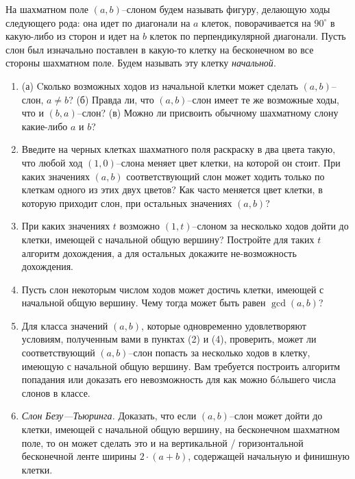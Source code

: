 ﻿

\ms На шахматном поле $(a,b)$--слоном будем называть фигуру, делающую ходы следующего рода: она идет по диагонали на $a$ клеток, поворачивается на $90^{\circ}$ в какую-либо из сторон и идет на $b$ клеток по перпендикулярной диагонали. Пусть слон был изначально поставлен в какую-то клетку на бесконечном во все стороны шахматном поле. Будем называть эту клетку {\itshape начальной}.

\begin{enumerate}

\item (а) Cколько возможных ходов из начальной клетки может сделать $(a,b)$--слон, $a \ne b$? (б) Правда ли, что $(a,b)$--слон имеет те же возможные ходы, что и $(b,a)$--слон? (в) Можно ли присвоить обычному шахматному слону какие-либо $a$ и $b$?

\item Введите на черных клетках шахматного поля раскраску в два цвета такую, что любой ход $(1,0)$--слона меняет цвет клетки, на которой он стоит. При каких значениях $(a,b)$ соответствующий слон может ходить только по клеткам одного из этих двух цветов? Как часто меняется цвет клетки, в которую приходит слон, при остальных значениях $(a,b)$?

\item При каких значениях $t$ возможно $(1,t)$--слоном за несколько ходов дойти до клетки, имеющей с начальной общую вершину? Постройте для таких $t$ алгоритм дохождения, а для остальных докажите не-\linebreak возможность дохождения.

\item Пусть слон некоторым числом ходов может достичь клетки, имеющей с начальной общую вершину. Чему тогда может быть равен $\gcd (a,b)$?

\item Для класса значений $(a,b)$, которые одновременно удовлетворяют условиям, полученным вами в пунктах (2) и (4), проверить, может ли соответствующий $(a,b)$--слон попасть за несколько ходов в клетку, имеющую с начальной общую вершину. Вам требуется построить алгоритм попадания или доказать его невозможность для как можно б\'oльшего числа слонов в классе.

\item {\itshape Слон Безу---Тьюринга.} Доказать, что если $(a,b)$--слон может дойти до клетки, имеющей с начальной общую вершину, на бесконечном шахматном поле, то он может сделать это и на вертикальной / горизонтальной бесконечной ленте ширины $2\cdot(a+b)$, содержащей начальную и финишную клетки.


\end{enumerate}
